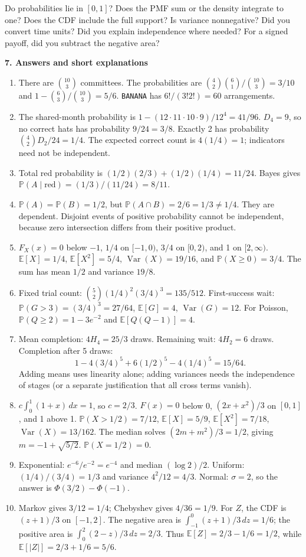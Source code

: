 \documentclass[11pt,letterpaper]{article}
\renewcommand{\P}{\mathbb P}
\newcommand{\E}{\mathbb E}
\DeclareMathOperator{\Var}{Var}
\newcommand{\topic}[1]{{\Large\bfseries\color{indigo}#1}\par\medskip}
\newcommand{\subtopic}[1]{\par\addvspace{7pt}{\bfseries\color{mint}#1}\par\nobreak}
\begin{document}
\subtopic{Final checks before you turn in a solution}
Do probabilities lie in $[0,1]$? Does the PMF sum or the density integrate
to one? Does the CDF include the full support? Is variance nonnegative?
Did you convert time units? Did you explain independence where needed?
For a signed payoff, did you subtract the negative area?

\newpage
\topic{7. Answers and short explanations}
\begin{enumerate}
\item There are $\binom{10}3$ committees. The probabilities are
$\binom42\binom61/\binom{10}3=3/10$ and
$1-\binom63/\binom{10}3=5/6$.
\texttt{BANANA} has $6!/(3!2!)=60$ arrangements.
\item The shared-month probability is
$1-(12\cdot11\cdot10\cdot9)/12^4=41/96$.
$D_4=9$, so no correct hats has probability $9/24=3/8$.
Exactly 2 has probability $\binom42D_2/24=1/4$.
The expected correct count is $4(1/4)=1$; indicators need not be independent.
\item Total red probability is $(1/2)(2/3)+(1/2)(1/4)=11/24$.
Bayes gives $\P(A\mid\text{red})=(1/3)/(11/24)=8/11$.
\item $\P(A)=\P(B)=1/2$, but $\P(A\cap B)=2/6=1/3\ne1/4$.
They are dependent. Disjoint events of positive probability cannot be
independent, because zero intersection differs from their positive product.
\item $F_X(x)=0$ below $-1$, $1/4$ on $[-1,0)$,
$3/4$ on $[0,2)$, and 1 on $[2,\infty)$.
$\E[X]=1/4$, $\E[X^2]=5/4$, $\Var(X)=19/16$,
and $\P(X\ge0)=3/4$. The sum has mean $1/2$ and variance $19/8$.
\item Fixed trial count: $\binom52(1/4)^2(3/4)^3=135/512$.
First-success wait: $\P(G>3)=(3/4)^3=27/64$,
$\E[G]=4$, $\Var(G)=12$.
For Poisson, $\P(Q\ge2)=1-3e^{-2}$ and $\E[Q(Q-1)]=4$.
\item Mean completion: $4H_4=25/3$ draws. Remaining wait:
$4H_2=6$ draws. Completion after 5 draws:
\[
1-4(3/4)^5+6(1/2)^5-4(1/4)^5=15/64.
\]
Adding means uses linearity alone; adding variances needs the independence
of stages (or a separate justification that all cross terms vanish).
\item $c\int_0^1(1+x)\,dx=1$, so $c=2/3$.
$F(x)=0$ below 0, $(2x+x^2)/3$ on $[0,1]$, and 1 above 1.
$\P(X>1/2)=7/12$, $\E[X]=5/9$, $\E[X^2]=7/18$,
$\Var(X)=13/162$.
The median solves $(2m+m^2)/3=1/2$, giving $m=-1+\sqrt{5/2}$.
$\P(X=1/2)=0$.
\item Exponential: $e^{-6}/e^{-2}=e^{-4}$ and median $(\log2)/2$.
Uniform: $(1/4)/(3/4)=1/3$ and variance $4^2/12=4/3$.
Normal: $\sigma=2$, so the answer is $\Phi(3/2)-\Phi(-1)$.
\item Markov gives $3/12=1/4$; Chebyshev gives $4/36=1/9$.
For $Z$, the CDF is $(z+1)/3$ on $[-1,2]$.
The negative area is $\int_{-1}^0(z+1)/3\,dz=1/6$;
the positive area is $\int_0^2(2-z)/3\,dz=2/3$.
Thus $\E[Z]=2/3-1/6=1/2$, while $\E[|Z|]=2/3+1/6=5/6$.
\end{enumerate}
\end{document}
